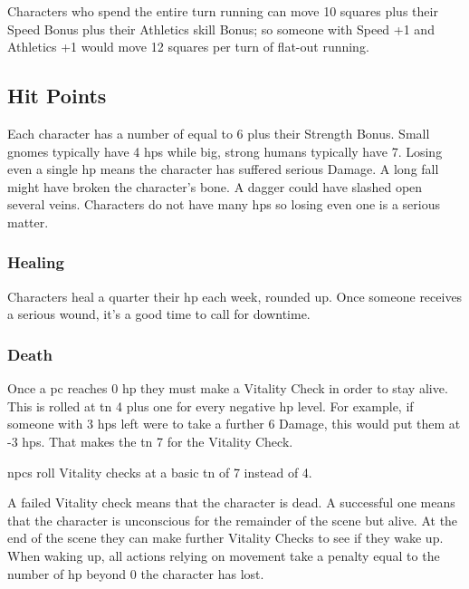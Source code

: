 \begin{multicols}{2}
Characters who spend the entire turn running can move 10 squares plus their Speed Bonus plus their Athletics \gls{skill} Bonus; so someone with Speed +1 and Athletics +1 would move 12 squares per turn of flat-out running.

\subsection{Hit Points}

Each character has a number of  equal to 6 plus their Strength Bonus.
Small gnomes typically have 4 \glspl{hp} while big, strong humans typically have 7.
Losing even a single \gls{hp} means the character has suffered serious Damage.
A long fall might have broken the character's bone.
A dagger could have slashed open several veins.
Characters do not have many \glspl{hp} so losing even one is a serious matter.

\subsubsection{Healing}
Characters heal a quarter their \gls{hp} each week, rounded up.
Once someone receives a serious wound, it's a good time to call for \gls{downtime}.

\subsubsection{Death}
Once a \gls{pc} reaches 0 \gls{hp} they must make a 
Vitality Check in order to stay alive.
This is rolled at \gls{tn} 4 plus one for every negative \gls{hp} level.\iftoggle{verbose}{\footnote{Traits such as Strength do not affect the Vitality check because in a way, they already have.
Stronger characters already have more \gls{hp}, which has already kept them farther from death.}}{}
For example, if someone with 3 \glspl{hp} left were to take a further 6 Damage, this would put them at -3 \glspl{hp}.
That makes the \gls{tn} 7 for the Vitality Check.

\glspl{npc} roll Vitality checks at a basic \gls{tn} of 7 instead of 4.

A failed Vitality check means that the character is dead.%
\iftoggle{verbose}{%
\footnote{See page \pageref{pcdeath} on what to do once a \gls{pc} dies.}%
}{%
  The player must roll up a new character with either 50 \glspl{xp} or half the total \glspl{xp} of whichever party member has the most \glspl{xp}.
}%
A successful one means that the character is unconscious for the remainder of the scene but alive.
At the end of the scene they can make further Vitality Checks to see if they wake up.
When waking up, all actions relying on movement take a penalty equal to the number of \gls{hp} beyond 0 the character has lost.


\end{multicols}
